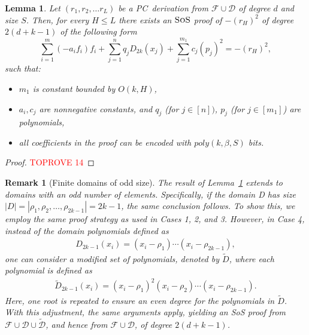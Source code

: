 \documentclass[11pt]{article}
\newcommand{\sos}{\text{\sc{SoS}}}
\newcommand{\PC}{\textsc{PC}}
\newcommand{\1}{\textbf{1}}
\newtheorem{lemma}[theorem]{Lemma}
\newtheorem{remark}[theorem]{Remark}
\begin{document}
\begin{lemma}\label{th:sos_sim_PC_1}
    Let $(r_1, r_2, \dots r_L)$ be a \PC\ derivation from $\mathcal{F}\cup \mathcal{D}$ of degree $d$ and size $S$. Then, for every $H\leq L$ there exists an $\sos$ proof of $-(r_H)^2$ of degree $2(d+k-1)$ of the following form
    \begin{equation}\label{eq:sosstep}
         \sum_{i=1}^m (-a_i f_i) f_i + \sum_{j=1}^{n} q_j D_{2k}(x_j) +\sum_{j=1}^{m_1} c_{j}(p_{j})^2=-(r_H)^2,
    \end{equation}
    such that:
    \begin{itemize}
        \item $m_1$ is constant bounded by $O(k, H)$,
        \item $a_i, c_j$ are nonnegative constants, and $q_j$ (for $j\in [n])$, $p_j$ (for $j\in [m_1]$) are polynomials,
        
        \item all coefficients in the proof can be encoded with $poly(k, \beta, S)$ bits.
    \end{itemize}
\end{lemma}

\begin{proof}\textcolor{red}{TOPROVE 14}\end{proof}

\begin{remark}[Finite domains of odd size]
    The result of Lemma~\ref{th:sos_sim_PC_1} extends to domains with an odd number of elements. Specifically, if the domain D has size $|D| = |{\rho_1, \rho_2, \ldots, \rho_{2k - 1}}| = 2k - 1$, the same conclusion follows. To show this, we employ the same proof strategy as used in Cases 1, 2, and 3. However, in Case 4, instead of the domain polynomials defined as
    \begin{align*}
        D_{2k-1}(x_i) = (x_i - \rho_1)\cdots(x_i - \rho_{2k-1}),
    \end{align*}
    one can consider a modified set of polynomials, denoted by $\tilde{D}$, where each polynomial is defined as
    \begin{align*}
        \tilde{D}_{2k-1}(x_i) = (x_i - \rho_1)^2(x_i - \rho_2)\cdots(x_i - \rho_{2k-1}).
    \end{align*}
    Here, one root is repeated to ensure an even degree for the polynomials in $\tilde{D}$. With this adjustment, the same arguments apply, yielding an SoS proof from $\mathcal{F} \cup \mathcal{D} \cup \tilde{\mathcal{D}}$, and hence from $\mathcal{F} \cup \mathcal{D}$, of degree $2(d + k - 1)$.
\end{remark}
\end{document}
